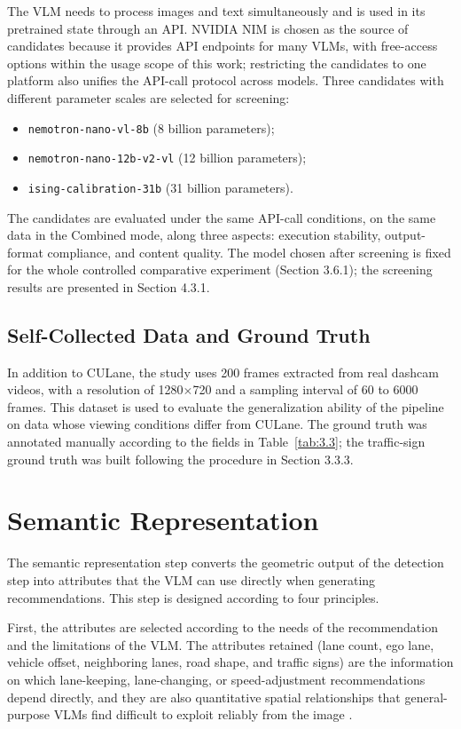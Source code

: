 \documentclass[12pt,a4paper]{report}
\begin{document}
The VLM needs to process images and text simultaneously and is used in its pretrained state through an API. NVIDIA NIM is chosen as the source of candidates because it provides API endpoints for many VLMs, with free-access options within the usage scope of this work; restricting the candidates to one platform also unifies the API-call protocol across models. Three candidates with different parameter scales are selected for screening:

\begin{itemize}
    \item \texttt{nemotron-nano-vl-8b} (8 billion parameters);
    \item \texttt{nemotron-nano-12b-v2-vl} (12 billion parameters);
    \item \texttt{ising-calibration-31b} (31 billion parameters).
\end{itemize}

The candidates are evaluated under the same API-call conditions, on the same data in the Combined mode, along three aspects: execution stability, output-format compliance, and content quality. The model chosen after screening is fixed for the whole controlled comparative experiment (Section 3.6.1); the screening results are presented in Section 4.3.1.

\subsection{Self-Collected Data and Ground Truth}

In addition to CULane, the study uses 200 frames extracted from real dashcam videos, with a resolution of 1280$\times$720 and a sampling interval of 60 to 6000 frames. This dataset is used to evaluate the generalization ability of the pipeline on data whose viewing conditions differ from CULane. The ground truth was annotated manually according to the fields in Table~\ref{tab:3.3}; the traffic-sign ground truth was built following the procedure in Section 3.3.3.

\section{Semantic Representation}

The semantic representation step converts the geometric output of the detection step into attributes that the VLM can use directly when generating recommendations. This step is designed according to four principles.

First, the attributes are selected according to the needs of the recommendation and the limitations of the VLM. The attributes retained (lane count, ego lane, vehicle offset, neighboring lanes, road shape, and traffic signs) are the information on which lane-keeping, lane-changing, or speed-adjustment recommendations depend directly, and they are also quantitative spatial relationships that general-purpose VLMs find difficult to exploit reliably from the image \cite{tong2024eyeswideshut,kamath2023whatsup}.
\end{document}
